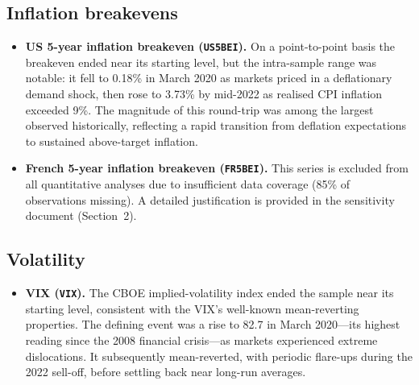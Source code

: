 \subsection*{Inflation breakevens}

\begin{itemize}
  \item \textbf{US 5-year inflation breakeven (\texttt{US5BEI}).}
    On a point-to-point basis the breakeven ended near its starting level,
    but the intra-sample range was notable: it fell to 0.18\% in March 2020
    as markets priced in a deflationary demand shock, then rose to 3.73\% by
    mid-2022 as realised CPI inflation exceeded 9\%. The magnitude of this
    round-trip was among the largest observed historically, reflecting a rapid
    transition from deflation expectations to sustained above-target inflation.

  \item \textbf{French 5-year inflation breakeven (\texttt{FR5BEI}).}
    This series is excluded from all quantitative analyses due to insufficient
    data coverage (85\% of observations missing). A detailed justification is
    provided in the sensitivity document (Section~2).
\end{itemize}

\subsection*{Volatility}

\begin{itemize}
  \item \textbf{VIX (\texttt{VIX}).}
    The CBOE implied-volatility index ended the sample near its starting
    level, consistent with the VIX's well-known mean-reverting properties. The
    defining event was a rise to 82.7 in March 2020---its
    highest reading since the 2008 financial crisis---as markets experienced
    extreme dislocations. It subsequently mean-reverted, with periodic
    flare-ups during the 2022 sell-off, before settling back near long-run
    averages.
\end{itemize}
